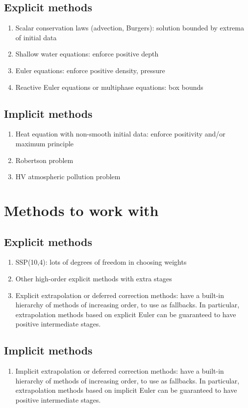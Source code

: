 \documentclass{article}
\begin{document}
\subsection{Explicit methods}

\begin{enumerate}
    \item Scalar conservation laws (advection, Burgers): solution bounded by extrema of initial data
    \item Shallow water equations: enforce positive depth
    \item Euler equations: enforce positive density, pressure
    \item Reactive Euler equations or multiphase equations: box bounds
\end{enumerate}

\subsection{Implicit methods}

\begin{enumerate}
    \item Heat equation with non-smooth initial data: enforce positivity and/or maximum principle
    \item Robertson problem
    \item HV atmospheric pollution problem
\end{enumerate}

\section{Methods to work with}
\subsection{Explicit methods}

\begin{enumerate}
    \item  SSP(10,4): lots of degrees of freedom in choosing weights
    \item Other high-order explicit methods with extra stages
    \item  Explicit extrapolation or deferred correction methods: have a built-in hierarchy of methods of increasing order, to use as fallbacks.  In particular, extrapolation methods based on explicit Euler can be guaranteed to have positive intermediate stages.
\end{enumerate}

\subsection{Implicit methods}
\begin{enumerate}
    \item  Implicit extrapolation or deferred correction methods: have a built-in hierarchy of methods of increasing order, to use as fallbacks.  In particular, extrapolation methods based on implicit Euler can be guaranteed to have positive intermediate stages.
\end{enumerate}
\end{document}
